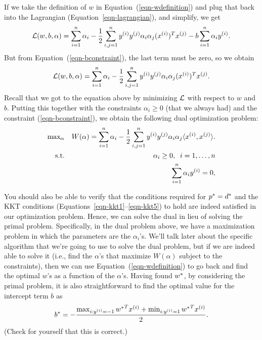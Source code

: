 \documentclass{article}
\begin{document}
If we take the definition of $w$ in Equation~(\ref{eqn-wdefinition}) and plug that back into
the Lagrangian (Equation~\ref{eqn-lagrangian}), and simplify, we get
\[
{\cal L}(w,b,\alpha) = \sum_{i=1}^{n} \alpha_i - \frac{1}{2} \sum_{i,j=1}^{n} y^{(i)} y^{(j)} \alpha_i \alpha_j (x^{(i)})^T x^{(j)} - b\sum_{i=1}^{n} \alpha_i {y^{(i)}}.
\]
But from Equation~(\ref{eqn-bconstraint}), the last term must be zero, so we obtain
\[
{\cal L}(w,b,\alpha) = \sum_{i=1}^{n} \alpha_i - \frac{1}{2} \sum_{i,j=1}^{n} y^{(i)} y^{(j)} \alpha_i \alpha_j (x^{(i)})^T x^{(j)}.
\]
Recall that we got to the equation above by minimizing ${\cal L}$ with respect to $w$ and $b$.
Putting this together with the constraints $\alpha_i \geq 0$ (that we always had) and the
constraint (\ref{eqn-bconstraint}), we obtain the following dual optimization problem:
\begin{eqnarray}\label{eqn:dual}
&\hbox{max}_{\alpha} & W(\alpha) =
\sum_{i=1}^{n} \alpha_i - \frac{1}{2} \sum_{i,j=1}^{n} y^{(i)} y^{(j)} \alpha_i \alpha_j \langle x^{(i)},  x^{(j)} \rangle. \\
&\;\;\;\;\hbox{s.t.}& \alpha_i \geq 0, \;\; i=1,\ldots,{n} \nonumber\\
&&                          \sum_{i=1}^{n} \alpha_i {y^{(i)}} = 0,\nonumber
\end{eqnarray}

You should also be able to verify that the conditions required for ${p^{\ast}} = {d^{\ast}}$ and the KKT conditions
(Equations~\ref{eqn-kkt1}--\ref{eqn-kkt5}) to hold are indeed satisfied in our optimization
problem. %
Hence, we can solve the dual in lieu of solving the primal problem.  Specifically, in the dual problem
above, we have a maximization problem in which the parameters are the $\alpha_i$'s.  We'll talk later
about the specific algorithm that we're going to use to solve the dual problem, but if we are
indeed able to solve it (i.e., find the $\alpha$'s that maximize $W(\alpha)$ subject to the
constraints), then we can use Equation~(\ref{eqn-wdefinition}) to go back and find the optimal $w$'s
as a function of the $\alpha$'s.  Having found ${w^{\ast}}$,
by considering the primal problem, it is also straightforward to find the optimal value for
the intercept term $b$ as
\begin{equation}
{b^{\ast}} = - \frac{\max_{i : {y^{(i)}} = -1} {w^{\ast}}^T {x^{(i)}} + \min_{i : {y^{(i)}} = 1} {w^{\ast}}^T {x^{(i)}}}{2}.
		\label{eqn-bstar}
\end{equation}
(Check for yourself that this is correct.)
\end{document}
